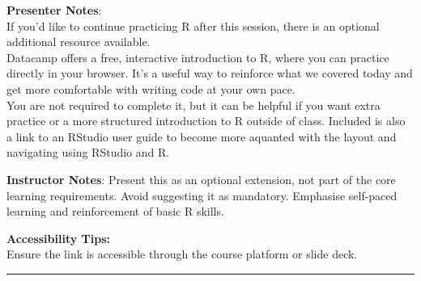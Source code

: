 \documentclass[
  letterpaper,
  DIV=11,
  numbers=noendperiod]{scrartcl}
\begin{document}
\textbf{Presenter Notes}:\\
If you'd like to continue practicing R after this session, there is an
optional additional resource available.\\
Datacamp offers a free, interactive introduction to R, where you can
practice directly in your browser. It's a useful way to reinforce what
we covered today and get more comfortable with writing code at your own
pace.\\
You are not required to complete it, but it can be helpful if you want
extra practice or a more structured introduction to R outside of class.
Included is also a link to an RStudio user guide to become more aquanted
with the layout and navigating using RStudio and R.

\textbf{Instructor Notes}: Present this as an optional extension, not
part of the core learning requirements. Avoid suggesting it as
mandatory. Emphasise self-paced learning and reinforcement of basic R
skills.

\textbf{Accessibility Tips:}\\
Ensure the link is accessible through the course platform or slide deck.

\begin{center}\rule{0.5\linewidth}{0.5pt}\end{center}
\end{document}
